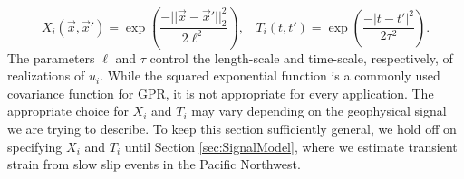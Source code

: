 \documentclass[extra,mreferee]{gji}
\begin{document}
\begin{equation}\label{eq:ExampleCov}
X_i(\vec{x},\vec{x}') = \exp\left(\frac{-||\vec{x} - \vec{x}'||_2^2}{2\ell^2}\right), \ \ \ \ T_i(t,t') = \exp\left(\frac{-|t - t'|^2}{2\tau^2}\right).
\end{equation}
The parameters $\ell$ and $\tau$ control the length-scale and time-scale, respectively, of realizations of $u_i$. While the squared exponential function is a commonly used covariance function for GPR, it is not appropriate for every application. The appropriate choice for $X_i$ and $T_i$ may vary depending on the geophysical signal we are trying to describe. To keep this section sufficiently general, we hold off on specifying $X_i$ and $T_i$ until Section \ref{sec:SignalModel}, where we estimate transient strain from slow slip events in the Pacific Northwest. 
\end{document}
